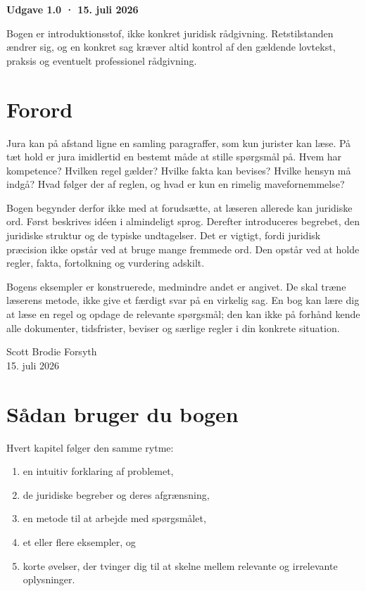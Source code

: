 \documentclass[12pt,oneside,openany]{memoir}
\begin{document}
\vfill
\begin{keybox}
\textbf{Udgave 1.0 · 15. juli 2026}\par
Bogen er introduktionsstof, ikke konkret juridisk rådgivning. Retstilstanden ændrer sig, og en konkret sag kræver altid kontrol af den gældende lovtekst, praksis og eventuelt professionel rådgivning.
\end{keybox}
\clearpage

\chapter*{Forord}
Jura kan på afstand ligne en samling paragraffer, som kun jurister kan læse. På tæt hold er jura imidlertid en bestemt måde at stille spørgsmål på. Hvem har kompetence? Hvilken regel gælder? Hvilke fakta kan bevises? Hvilke hensyn må indgå? Hvad følger der af reglen, og hvad er kun en rimelig mavefornemmelse?

Bogen begynder derfor ikke med at forudsætte, at læseren allerede kan juridiske ord. Først beskrives idéen i almindeligt sprog. Derefter introduceres begrebet, den juridiske struktur og de typiske undtagelser. Det er vigtigt, fordi juridisk præcision ikke opstår ved at bruge mange fremmede ord. Den opstår ved at holde regler, fakta, fortolkning og vurdering adskilt.

Bogens eksempler er konstruerede, medmindre andet er angivet. De skal træne læserens metode, ikke give et færdigt svar på en virkelig sag. En bog kan lære dig at læse en regel og opdage de relevante spørgsmål; den kan ikke på forhånd kende alle dokumenter, tidsfrister, beviser og særlige regler i din konkrete situation.

\vspace{1em}
\begin{flushright}
Scott Brodie Forsyth\\
15. juli 2026
\end{flushright}

\chapter*{Sådan bruger du bogen}
Hvert kapitel følger den samme rytme:
\begin{enumerate}
  \item en intuitiv forklaring af problemet,
  \item de juridiske begreber og deres afgrænsning,
  \item en metode til at arbejde med spørgsmålet,
  \item et eller flere eksempler, og
  \item korte øvelser, der tvinger dig til at skelne mellem relevante og irrelevante oplysninger.
\end{enumerate}
\end{document}
